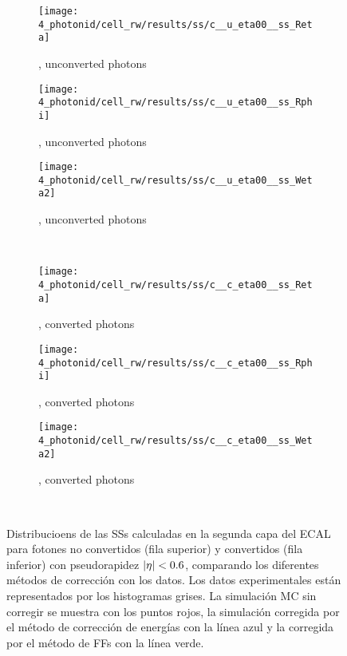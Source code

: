 \begin{figure}[ht!]
    \centering
    \begin{subfigure}[h]{0.32\linewidth}
        \centering
        \texttt{[image: 4\_photonid/cell\_rw/results/ss/c\_\_u\_eta00\_\_ss\_Reta]}
        \caption{\reta, unconverted photons}
    \end{subfigure}
    \hfill
    \begin{subfigure}[h]{0.32\linewidth}
        \centering
        \texttt{[image: 4\_photonid/cell\_rw/results/ss/c\_\_u\_eta00\_\_ss\_Rphi]}
        \caption{\rphi, unconverted photons}
    \end{subfigure}
    \begin{subfigure}[h]{0.32\linewidth}
        \centering
        \texttt{[image: 4\_photonid/cell\_rw/results/ss/c\_\_u\_eta00\_\_ss\_Weta2]}
        \caption{\weta, unconverted photons}
    \end{subfigure}\\
    \begin{subfigure}[h]{0.32\linewidth}
        \centering
        \texttt{[image: 4\_photonid/cell\_rw/results/ss/c\_\_c\_eta00\_\_ss\_Reta]}
        \caption{\reta, converted photons}
    \end{subfigure}
    \hfill
    \begin{subfigure}[h]{0.32\linewidth}
        \centering
        \texttt{[image: 4\_photonid/cell\_rw/results/ss/c\_\_c\_eta00\_\_ss\_Rphi]}
        \caption{\rphi, converted photons}
    \end{subfigure}
    \begin{subfigure}[h]{0.32\linewidth}
        \centering
        \texttt{[image: 4\_photonid/cell\_rw/results/ss/c\_\_c\_eta00\_\_ss\_Weta2]}
        \caption{\weta, converted photons}
    \end{subfigure}\\
    \caption{Distribucioens de las \acp{SS} calculadas en la segunda capa del \ac{ECAL} para fotones no convertidos (fila superior) y convertidos (fila inferior) con pseudorapidez \(|\eta|<0.6\), comparando los diferentes m\'etodos de correcci\'on con los datos. Los datos experimentales est\'an representados por los histogramas grises. La simulaci\'on \ac{MC} sin corregir se muestra con los puntos rojos, la simulaci\'on corregida por el m\'etodo de correcci\'on de energ\'ias con la l\'inea azul y la corregida por el m\'etodo de \acp{FF} con la l\'inea verde.}
    \label{fig:ss_corrections:cell_rw:results:ss}
\end{figure}






